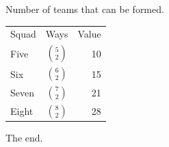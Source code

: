 \documentclass{article}
\begin{document}
Number of teams that can be formed.

\begin{tabular}{lcr}
Squad & Ways & Value \\
Five & $\binom{5}{2}$ & 10 \\
Six & $\binom{6}{2}$ & 15 \\
Seven & $\binom{7}{2}$ & 21 \\
Eight & $\binom{8}{2}$ & 28 \\
\end{tabular}

The end.
\end{document}
